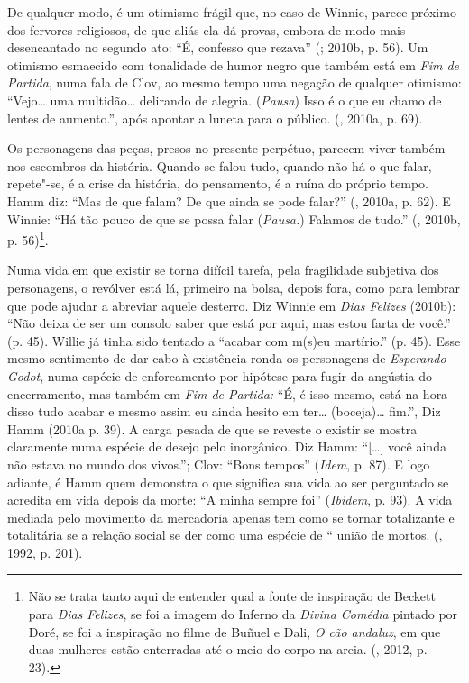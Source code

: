 De qualquer modo, é um otimismo frágil que, no caso de Winnie, parece
próximo dos fervores religiosos, de que aliás ela dá provas, embora de
modo mais desencantado no segundo ato: ``É, confesso que rezava''
(; 2010b, p. 56). Um otimismo esmaecido com tonalidade de humor
negro que também está em \emph{Fim de Partida}, numa fala de Clov, ao
mesmo tempo uma negação de qualquer otimismo: ``Vejo\ldots{} uma multidão\ldots{}
delirando de alegria. (\emph{Pausa}) Isso é o que eu chamo de lentes de
aumento.'', após apontar a luneta para o público. (, 2010a, p.
69).

Os personagens das peças, presos no presente perpétuo, parecem viver
também nos escombros da história. Quando se falou tudo, quando não há o
que falar, repete"-se, é a crise da história, do pensamento, é a ruína do
próprio tempo. Hamm diz: ``Mas de que falam? De que ainda se pode
falar?'' (, 2010a, p. 62). E Winnie: ``Há tão pouco de que se
possa falar (\emph{Pausa.}) Falamos de tudo.'' (, 2010b, p.
56)\footnote{Não se trata tanto aqui de entender qual a fonte de
  inspiração de Beckett para \emph{Dias} \emph{Felizes}, se foi a imagem
  do Inferno da \emph{Divina Comédia} pintado por Doré, se foi a
  inspiração no filme de Buñuel e Dali, \emph{O cão andaluz}, em que
  duas mulheres estão enterradas até o meio do corpo na areia.
  (, 2012, p. 23).}.

Numa vida em que existir se torna difícil tarefa, pela fragilidade
subjetiva dos personagens, o revólver está lá, primeiro na bolsa, depois
fora, como para lembrar que pode ajudar a abreviar aquele desterro. Diz
Winnie em \emph{Dias Felizes} (2010b): ``Não deixa de ser um consolo
saber que está por aqui, mas estou farta de você.'' (p. 45). Willie já
tinha sido tentado a ``acabar com m(s)eu martírio.'' (p. 45). Esse mesmo
sentimento de dar cabo à existência ronda os personagens de
\emph{Esperando Godot}, numa espécie de enforcamento por hipótese para
fugir da angústia do encerramento, mas também em \emph{Fim de Partida:}
``É, é isso mesmo, está na hora disso tudo acabar e mesmo assim eu ainda
hesito em ter\ldots{} (boceja)\ldots{} fim.'', Diz Hamm (2010a p. 39). A carga
pesada de que se reveste o existir se mostra claramente numa espécie de
desejo pelo inorgânico. Diz Hamm: ``[\ldots{}] você ainda não estava no
mundo dos vivos.''; Clov: ``Bons tempos'' (\emph{Idem}, p. 87). E logo
adiante, é Hamm quem demonstra o que significa sua vida ao ser
perguntado se acredita em vida depois da morte: ``A minha sempre foi''
(\emph{Ibidem}, p. 93). A vida mediada pelo movimento da mercadoria
apenas tem como se tornar totalizante e totalitária se a relação social
se der como uma espécie de `` união de mortos. (, 1992, p. 201).

